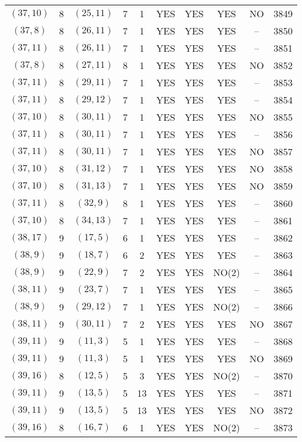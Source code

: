 \begin{longtable}{|c|c|c|c|c|c|c|c|c|c|}
$(37, 10)$ & 8 & $(25, 11)$ & 7 & 1 & YES & YES & YES & NO & 3849\\
$(37, 8)$ & 8 & $(26, 11)$ & 7 & 1 & YES & YES & YES & -- & 3850\\
$(37, 11)$ & 8 & $(26, 11)$ & 7 & 1 & YES & YES & YES & -- & 3851\\
$(37, 8)$ & 8 & $(27, 11)$ & 8 & 1 & YES & YES & YES & NO & 3852\\
$(37, 11)$ & 8 & $(29, 11)$ & 7 & 1 & YES & YES & YES & -- & 3853\\
$(37, 11)$ & 8 & $(29, 12)$ & 7 & 1 & YES & YES & YES & -- & 3854\\
$(37, 10)$ & 8 & $(30, 11)$ & 7 & 1 & YES & YES & YES & NO & 3855\\
$(37, 11)$ & 8 & $(30, 11)$ & 7 & 1 & YES & YES & YES & -- & 3856\\
$(37, 11)$ & 8 & $(30, 11)$ & 7 & 1 & YES & YES & YES & NO & 3857\\
$(37, 10)$ & 8 & $(31, 12)$ & 7 & 1 & YES & YES & YES & NO & 3858\\
$(37, 10)$ & 8 & $(31, 13)$ & 7 & 1 & YES & YES & YES & NO & 3859\\
$(37, 11)$ & 8 & $(32, 9)$ & 8 & 1 & YES & YES & YES & -- & 3860\\
$(37, 10)$ & 8 & $(34, 13)$ & 7 & 1 & YES & YES & YES & -- & 3861\\
$(38, 17)$ & 9 & $(17, 5)$ & 6 & 1 & YES & YES & YES & -- & 3862\\
$(38, 9)$ & 9 & $(18, 7)$ & 6 & 2 & YES & YES & YES & -- & 3863\\
$(38, 9)$ & 9 & $(22, 9)$ & 7 & 2 & YES & YES & NO(2) & -- & 3864\\
$(38, 11)$ & 9 & $(23, 7)$ & 7 & 1 & YES & YES & YES & -- & 3865\\
$(38, 9)$ & 9 & $(29, 12)$ & 7 & 1 & YES & YES & NO(2) & -- & 3866\\
$(38, 11)$ & 9 & $(30, 11)$ & 7 & 2 & YES & YES & YES & NO & 3867\\
$(39, 11)$ & 9 & $(11, 3)$ & 5 & 1 & YES & YES & YES & -- & 3868\\
$(39, 11)$ & 9 & $(11, 3)$ & 5 & 1 & YES & YES & YES & NO & 3869\\
$(39, 16)$ & 8 & $(12, 5)$ & 5 & 3 & YES & YES & NO(2) & -- & 3870\\
$(39, 11)$ & 9 & $(13, 5)$ & 5 & 13 & YES & YES & YES & -- & 3871\\
$(39, 11)$ & 9 & $(13, 5)$ & 5 & 13 & YES & YES & YES & NO & 3872\\
$(39, 16)$ & 8 & $(16, 7)$ & 6 & 1 & YES & YES & NO(2) & -- & 3873\\

\end{longtable}
